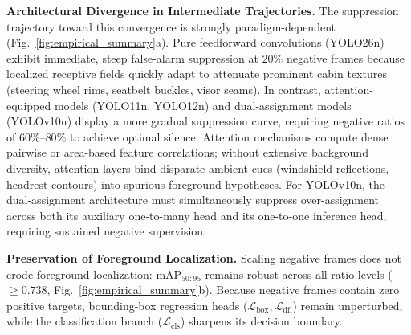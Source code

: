 \documentclass[conference]{IEEEtran}
\begin{document}
\noindent\textbf{Architectural Divergence in Intermediate Trajectories.}
The suppression trajectory toward this convergence is strongly paradigm-dependent (Fig.~\ref{fig:empirical_summary}a). Pure feedforward convolutions (YOLO26n) exhibit immediate, steep false-alarm suppression at $20\%$ negative frames because localized receptive fields quickly adapt to attenuate prominent cabin textures (steering wheel rims, seatbelt buckles, visor seams). In contrast, attention-equipped models (YOLO11n, YOLO12n) and dual-assignment models (YOLOv10n) display a more gradual suppression curve, requiring negative ratios of $60\%$--$80\%$ to achieve optimal silence. Attention mechanisms compute dense pairwise or area-based feature correlations; without extensive background diversity, attention layers bind disparate ambient cues (windshield reflections, headrest contours) into spurious foreground hypotheses. For YOLOv10n, the dual-assignment architecture must simultaneously suppress over-assignment across both its auxiliary one-to-many head and its one-to-one inference head, requiring sustained negative supervision.

\noindent\textbf{Preservation of Foreground Localization.}
Scaling negative frames does not erode foreground localization: $\mathrm{mAP}_{50:95}$ remains robust across all ratio levels ($\ge 0.738$, Fig.~\ref{fig:empirical_summary}b). Because negative frames contain zero positive targets, bounding-box regression heads ($\mathcal{L}_{\mathrm{box}}, \mathcal{L}_{\mathrm{dfl}}$) remain unperturbed, while the classification branch ($\mathcal{L}_{\mathrm{cls}}$) sharpens its decision boundary.
\end{document}
